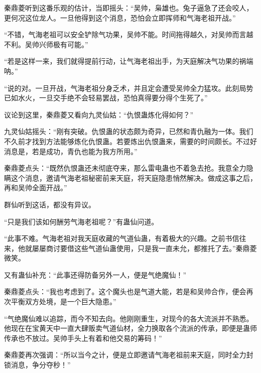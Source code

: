 \begin{this_body}
秦鼎菱听到这番乐观的估计，当即摇头：“吴帅，枭雄也。兔子逼急了还会咬人，更何况这位龙人。一旦他得到这个消息，恐怕会立即挥师和气海老祖开战。”

“不错，气海老祖可以安全铲除气功果，吴帅不能。时间拖得越久，对吴帅而言越不利。吴帅兴师极有可能。”

“若是这样一来，我们就得提前行动，让气海老祖出手，为天庭解决气功果的祸端呐。”

“说的对。一旦开战，气海老祖分身乏术，并且定会遭受吴帅全力猛攻。此刻局势已如水火，一旦交手绝不会轻易罢战，恐怕真得要分得个生死了。”

议论到这里，秦鼎菱又看向九灵仙姑：“仇恨蛊炼化得如何？”

九灵仙姑摇头：“刚有突破。仇恨蛊的状态颇为奇异，已然和青仇融为一体。我们不久前才找到方法能够炼化仇恨蛊。若要炼出仇恨蛊来，需要的时间颇长。不过好消息是，若是成功，青仇也能为我方所用。”

秦鼎菱点头：“既然仇恨蛊还未彻底夺来，那么雷电蛊也不着急去抢。我意全力隐瞒这个消息，邀请气海老祖秘密前来天庭，将天庭隐患悄然解决。做成这事之后，再和吴帅全面开战。”

群仙听到这话，都没有异议。

“只是我们该如何酬劳气海老祖呢？”有蛊仙问道。

“此事不难。气海老祖对我天庭收藏的气道仙蛊，有着极大的兴趣。之前书信往来，他就屡屡商讨要借这些气道仙蛊使用，只是我一直未允，都推托了去。”秦鼎菱微笑。

又有蛊仙补充：“此事还得防备另外一人，便是气绝魔仙！”

秦鼎菱点头：“我也考虑到了。这个魔头也是气道大能，若是和吴帅合作，便会再次平衡双方处境，是一个巨大隐患。”

“气绝魔仙难以追踪，而今不知去向。他刚刚重生，对现今的各大流派并不熟悉。他现在在宝黄天中一直大肆贩卖气道仙材，全力换取各个流派的传承，即便是蛊师传承也不放过。吴帅手头上有着和他交易的筹码！”

秦鼎菱再次强调：“所以当今之计，便是立即邀请气海老祖前来天庭，同时全力封锁消息，争分夺秒！”

\end{this_body}

